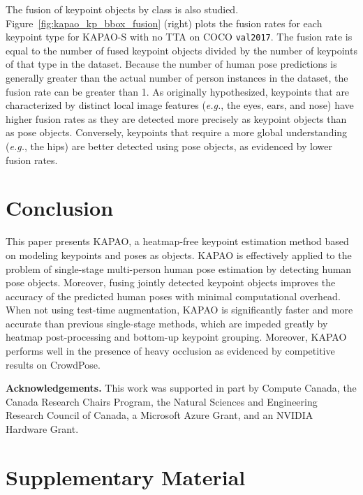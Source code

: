 \documentclass[runningheads]{llncs}
\newcommand{\eg}{\textit{e.g.}}
\begin{document}
The fusion of keypoint objects by class is also studied. Figure~\ref{fig:kapao_kp_bbox_fusion} (right) plots the fusion rates for each keypoint type for KAPAO-S with no TTA on COCO \texttt{val2017}. The fusion rate is equal to the number of fused keypoint objects divided by the number of keypoints of that type in the dataset. Because the number of human pose predictions is generally greater than the actual number of person instances in the dataset, the fusion rate can be greater than 1. As originally hypothesized, keypoints that are characterized by distinct local image features (\eg, the eyes, ears, and nose) have higher fusion rates as they are detected more precisely as keypoint objects than as pose objects. Conversely, keypoints that require a more global understanding (\eg, the hips) are better detected using pose objects, as evidenced by lower fusion rates.

\section{Conclusion}
This paper presents KAPAO, a heatmap-free keypoint estimation method based on modeling keypoints and poses as objects. KAPAO is effectively applied to the problem of single-stage multi-person human pose estimation by detecting human pose objects. Moreover, fusing jointly detected keypoint objects improves the accuracy of the predicted human poses with minimal computational overhead. When not using test-time augmentation, KAPAO is significantly faster and more accurate than previous single-stage methods, which are impeded greatly by heatmap post-processing and bottom-up keypoint grouping. Moreover, KAPAO performs well in the presence of heavy occlusion as evidenced by competitive results on CrowdPose.

{\bigskip\noindent\small\textbf{Acknowledgements.} This work was supported in part by Compute Canada, the Canada Research Chairs Program, the Natural Sciences and Engineering Research Council of Canada, a Microsoft Azure Grant, and an NVIDIA Hardware Grant.}







\clearpage
\appendix

\section{Supplementary Material}
\end{document}
